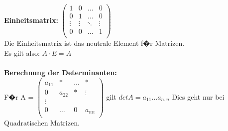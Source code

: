 \textbf{Einheitsmatrix:} 
$
\begin{pmatrix}
1 & 0 & \dots & 0 \\
0 & 1 & \dots & 0 \\
\vdots & \vdots & \ddots & \vdots \\
0 & 0 & \dots & 1 \\ 
\end{pmatrix}
$\\
Die Einheitsmatrix ist das neutrale Element f�r Matrizen.\\
Es gilt also: $A \cdot E = A$\\\\
\textbf{Berechnung der Determinanten:}\\
F�r A =
$\begin{pmatrix}
a_{11} & * & \dots & * \\
0 & a_{22} & * & \vdots \\
\vdots & & & \\
0 & \dots & 0 & a_{nn} \\
\end{pmatrix}$
gilt $detA = a_{11} \dots a_{n,n}$
Dies geht nur bei Quadratischen Matrizen.
